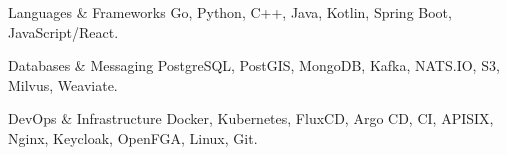 
\begin{cvskills}

  \cvskill
    {Languages \& Frameworks}
    {Go, Python, C++, Java, Kotlin, Spring Boot, JavaScript/React.}

  \cvskill
    {Databases \& Messaging}
    {PostgreSQL, PostGIS, MongoDB, Kafka, NATS.IO, S3, Milvus, Weaviate.}

  \cvskill
    {DevOps \& Infrastructure}
    {Docker, Kubernetes, FluxCD, Argo CD, CI, APISIX, Nginx, Keycloak, OpenFGA, Linux, Git.}

\end{cvskills}
